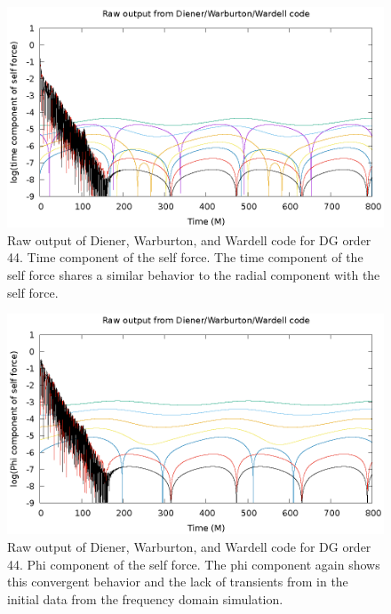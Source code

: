 \begin{figure}
  \includegraphics{rawTimeSelfForceModes}
  \caption{Raw output of Diener, Warburton, and Wardell code for DG order 44. Time component of the self force. The time component of the self force shares a similar behavior to the radial component with the self force.}
  \label{tsf}
\end{figure}

\begin{figure}
  \includegraphics{rawPhiSelfForceModes}
  \caption{Raw output of Diener, Warburton, and Wardell code for DG order 44. Phi component of the self force. The phi component again shows this convergent behavior and the lack of transients from in the initial data from the frequency domain simulation.}
  \label{phisf}
\end{figure}

